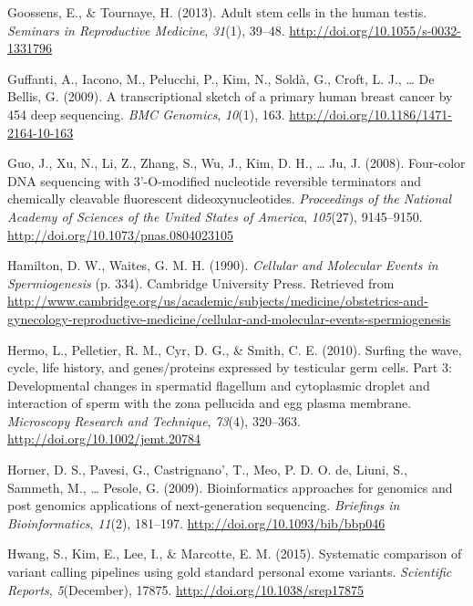 \documentclass[12pt,twoside]{reedthesis}
\theoremstyle{definition}
\theoremstyle{definition}
\theoremstyle{remark}
\begin{document}
  \hypertarget{ref-Goossens2013}{}
  Goossens, E., \& Tournaye, H. (2013). Adult stem cells in the human
  testis. \emph{Seminars in Reproductive Medicine}, \emph{31}(1), 39--48.
  \url{http://doi.org/10.1055/s-0032-1331796}
  
  \hypertarget{ref-Guffanti2009}{}
  Guffanti, A., Iacono, M., Pelucchi, P., Kim, N., Soldà, G., Croft, L.
  J., \ldots{} De Bellis, G. (2009). A transcriptional sketch of a primary
  human breast cancer by 454 deep sequencing. \emph{BMC Genomics},
  \emph{10}(1), 163. \url{http://doi.org/10.1186/1471-2164-10-163}
  
  \hypertarget{ref-Guo2008}{}
  Guo, J., Xu, N., Li, Z., Zhang, S., Wu, J., Kim, D. H., \ldots{} Ju, J.
  (2008). Four-color DNA sequencing with 3'-O-modified nucleotide
  reversible terminators and chemically cleavable fluorescent
  dideoxynucleotides. \emph{Proceedings of the National Academy of
  Sciences of the United States of America}, \emph{105}(27), 9145--9150.
  \url{http://doi.org/10.1073/pnas.0804023105}
  
  \hypertarget{ref-Hamilton1987}{}
  Hamilton, D. W., Waites, G. M. H. (1990). \emph{Cellular and Molecular
  Events in Spermiogenesis} (p. 334). Cambridge University Press.
  Retrieved from
  \url{http://www.cambridge.org/us/academic/subjects/medicine/obstetrics-and-gynecology-reproductive-medicine/cellular-and-molecular-events-spermiogenesis}
  
  \hypertarget{ref-Hermo2010}{}
  Hermo, L., Pelletier, R. M., Cyr, D. G., \& Smith, C. E. (2010). Surfing
  the wave, cycle, life history, and genes/proteins expressed by
  testicular germ cells. Part 3: Developmental changes in spermatid
  flagellum and cytoplasmic droplet and interaction of sperm with the zona
  pellucida and egg plasma membrane. \emph{Microscopy Research and
  Technique}, \emph{73}(4), 320--363.
  \url{http://doi.org/10.1002/jemt.20784}
  
  \hypertarget{ref-Horner2009}{}
  Horner, D. S., Pavesi, G., Castrignano', T., Meo, P. D. O. de, Liuni,
  S., Sammeth, M., \ldots{} Pesole, G. (2009). Bioinformatics approaches
  for genomics and post genomics applications of next-generation
  sequencing. \emph{Briefings in Bioinformatics}, \emph{11}(2), 181--197.
  \url{http://doi.org/10.1093/bib/bbp046}
  
  \hypertarget{ref-Hwang2015}{}
  Hwang, S., Kim, E., Lee, I., \& Marcotte, E. M. (2015). Systematic
  comparison of variant calling pipelines using gold standard personal
  exome variants. \emph{Scientific Reports}, \emph{5}(December), 17875.
  \url{http://doi.org/10.1038/srep17875}
  
\end{document}
